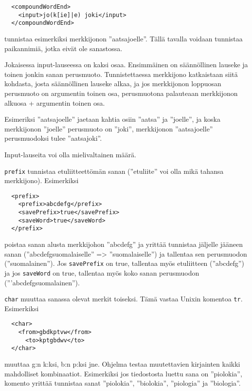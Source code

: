 \documentclass[12pt]{article}
\begin{document}
\begin{verbatim}
  <compoundWordEnd>
    <input>jo(k[ie]|e) joki</input>
  </compoundWordEnd>
\end{verbatim}

tunnistaa esimerkiksi merkkijonon ''aatsajoelle''. Tällä tavalla
voidaan tunnistaa paikannimiä, jotka eivät ole sanastossa.

Jokaisessa input-lauseessa on kaksi osaa. Ensimmäinen on säännöllinen
lauseke ja toinen jonkin sanan perusmuoto. Tunnistettaessa merkkijono
katkaistaan siitä kohdasta, josta säännöllinen lauseke alkaa, ja jos
merkkijonon loppuosan perusmuoto on argumentin toinen osa,
perusmuotona palauteaan merkkijonon alkuosa + argumentin toinen osa.

Esimeriksi ''aatsajoelle'' jaetaan kahtia osiin ''aatsa'' ja
''joelle'', ja koska merkkijonon ''joelle'' perusmuoto on ''joki'',
merkkijonon ''aatsajoelle'' perusmuodoksi tulee ''aatsajoki''.

Input-lauseita voi olla mielivaltainen määrä.




\bigskip
\verb|prefix| tunnistaa etuliitteettömän sanan (''etuliite'' voi olla
mikä tahansa merkkijono). Esimerkiksi

\begin{verbatim}
  <prefix>
    <prefix>abcdefg</prefix>
    <savePrefix>true</savePrefix>
    <saveWord>true</saveWord>
  </prefix>
\end{verbatim}

poistaa sanan alusta merkkijohon ''abcdefg'' ja yrittää tunnistaa
jäljelle jääneen sanan (''abcdefgsuomalaiselle'' => ''suomalaiselle'')
ja tallentaa sen perusmuodon (''suomalainen''). Jos \verb|savePrefix|
on true, tallentaa myös etuliitteen (''abcdefg'') ja jos
\verb|saveWord| on true, tallentaa myös koko sanan perusmuodon
('''abcdefgsuomalainen'').




\bigskip
\verb|char| muuttaa sanassa olevat merkit toiseksi. Tämä vastaa Unixin
komentoa \verb|tr|. Esimerkiksi

\begin{verbatim}
  <char>
    <from>gbdkptvw</from>
      <to>kptgbdwv</to>
  </char>
\end{verbatim}

muuttaa g:n k:ksi, b:n p:ksi jne. Ohjelma testaa muutettavien
kirjainten kaikki mahdolliset kombinaatiot. Esimerkiksi jos
tiedostosta luettu sana on ''piolokia'', komento yrittää tunnistaa
sanat ''piolokia'', ''biolokia'', ''piologia'' ja ''biologia''.
\end{document}
